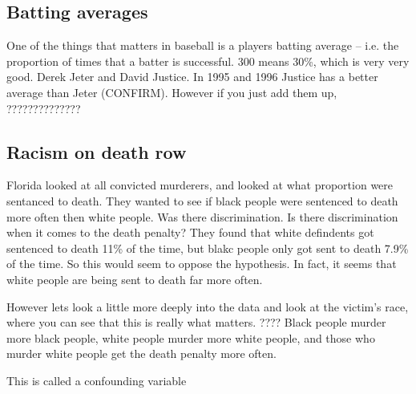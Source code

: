 \documentclass{report}
\begin{document}
\subsection{Batting averages}
\todo One of the things that matters in baseball is a players batting average -- i.e. the proportion of times that a batter is successful. 300 means 30\%, which is very very good. Derek Jeter and David Justice. In 1995 and 1996 Justice has a better average than Jeter (CONFIRM). However if you just add them up, 
??????????????
\subsection{Racism on death row}
\todo Florida looked at all convicted murderers, and looked at what proportion were sentanced to death. They wanted to see if black people were sentenced to death more often then white people. Was there discrimination. Is there discrimination when it comes to the death penalty? They found that white defindents got sentenced to death 11\% of the time, but blakc people only got sent to death 7.9\% of the time. So this would seem to oppose the hypothesis. In fact, it seems that white people are being sent to death far more often. 

However lets look a little more deeply into the data and look at the victim's race, where you can see that this is really what matters. ???? Black people murder more black people, white people murder more white people, and those who murder white people get the death penalty more often. 

This is called a confounding variable
\end{document}
